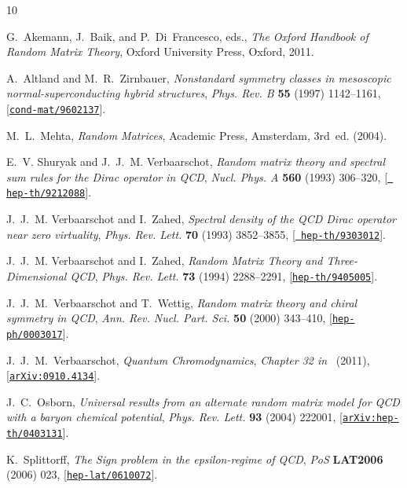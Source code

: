 \documentclass[aps,prl,reprint,graphicx,showpacs]{revtex4-1}
\begin{document}
\begin{thebibliography}{10}

G.~Akemann, J.~Baik, and P.~Di~Francesco, eds., {\em {The Oxford Handbook of
  Random Matrix Theory}},
\newblock Oxford University Press, Oxford, 2011.

{ 
A.~Altland and M.~R.~Zirnbauer, {\it Nonstandard symmetry classes in mesoscopic normal-superconducting hybrid structures}, {\em Phys. Rev. B} {\bf 55} (1997) 1142--1161,
[\href{https://arxiv.org/abs/cond-mat/9602137}{{\tt cond-mat/9602137}}].
}

M.~L.~Mehta, {\em {Random Matrices}}, Academic Press, Amsterdam, 3rd~ed. (2004).

E.~V. Shuryak and J.~J.~M. Verbaarschot, {\it {Random matrix theory and
  spectral sum rules for the Dirac operator in QCD}},  {\em Nucl. Phys. A} {\bf
  560} (1993) 306--320, [\href{http://arxiv.org/abs/hep-th/9212088}{{\tt
  hep-th/9212088}}].

J.~J.~M. Verbaarschot and I.~Zahed, {\it {Spectral density of the QCD Dirac
  operator near zero virtuality}},  {\em Phys. Rev. Lett.} {\bf 70} (1993)
  3852--3855, [\href{http://arxiv.org/abs/hep-th/9303012}{{\tt
  hep-th/9303012}}].

J.~J.~M. Verbaarschot and I.~Zahed, {\it {Random Matrix Theory and Three-Dimensional QCD}},  {\em Phys. Rev. Lett.} {\bf 73} (1994) 2288--2291,
  [\href{http://arxiv.org/abs/hep-th/9405005}{{\tt hep-th/9405005}}].

J.~J.~M.~Verbaarschot and T.~Wettig, {\it Random matrix theory and chiral symmetry in QCD}, 
{\em Ann. Rev. Nucl. Part. Sci.} {\bf 50} (2000) 343--410, 
[\href{http://arxiv.org/abs/hep-ph/0003017}{\tt hep-ph/0003017}].

J.~J.~M.~Verbaarschot, {\it {Quantum Chromodynamics}},  {\em Chapter 32 in}~\cite{handbook:2010} (2011),
  [\href{https://arxiv.org/abs/0910.4134}{{\tt arXiv:0910.4134}}].

J.~C.~Osborn, {\it {Universal results from an alternate random matrix model for QCD with a baryon chemical potential}},  {\em Phys. Rev. Lett.} {\bf 93} (2004) 222001,
  [\href{https://arxiv.org/abs/hep-th/0403131}{{\tt arXiv:hep-th/0403131}}].

K.~Splittorff, {\it{The Sign problem in the epsilon-regime of QCD}}, {\em PoS} {\bf LAT2006} (2006) 023, 
[\href{http://arxiv.org/abs/hep-lat/0610072}{\tt hep-lat/0610072}].


\end{thebibliography}
\end{document}
